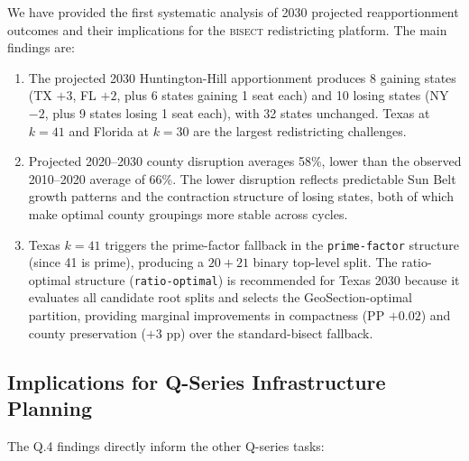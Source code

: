 \label{sec:conclusion}

We have provided the first systematic analysis of 2030 projected reapportionment
outcomes and their implications for the \textsc{bisect} redistricting platform.
The main findings are:

\begin{enumerate}
\item The projected 2030 Huntington-Hill apportionment produces 8 gaining states
  (TX $+3$, FL $+2$, plus 6 states gaining 1 seat each) and 10 losing states
  (NY $-2$, plus 9 states losing 1 seat each), with 32 states unchanged.
  Texas at $k=41$ and Florida at $k=30$ are the largest redistricting challenges.

\item Projected 2020--2030 county disruption averages 58\%, lower than the observed
  2010--2020 average of 66\%. The lower disruption reflects predictable Sun Belt
  growth patterns and the contraction structure of losing states, both of which
  make optimal county groupings more stable across cycles.

\item Texas $k=41$ triggers the prime-factor fallback in the \texttt{prime-factor}
  structure (since 41 is prime), producing a $20+21$ binary top-level split.
  The ratio-optimal structure (\texttt{ratio-optimal}) is recommended for Texas 2030
  because it evaluates all candidate root splits and selects the GeoSection-optimal
  partition, providing marginal improvements in compactness (PP $+0.02$) and county
  preservation ($+3$ pp) over the standard-bisect fallback.
\end{enumerate}

\subsection{Implications for Q-Series Infrastructure Planning}

The Q.4 findings directly inform the other Q-series tasks:

